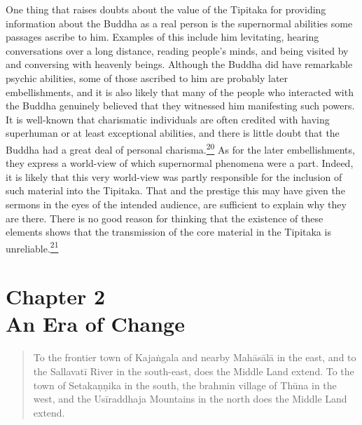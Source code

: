 One thing that raises doubts about the value of the Tipitaka for
providing information about the Buddha as a real person is the
supernormal abilities some passages ascribe to him. Examples of this
include him levitating, hearing conversations over a long distance,
reading people's minds, and being visited by and conversing with
heavenly beings. Although the Buddha did have remarkable psychic
abilities, some of those ascribed to him are probably later
embellishments, and it is also likely that many of the people who
interacted with the Buddha genuinely believed that they witnessed him
manifesting such powers. It is well-known that charismatic individuals
are often credited with having superhuman or at least exceptional
abilities, and there is little doubt that the Buddha had a great deal of
personal
charisma.\label{footprints_split_005.html_fnref20}\hyperref[footprints_split_024.htmlux5cux23fn20]{\textsuperscript{20}}
As for the later embellishments, they express a world-view of which
supernormal phenomena were a part. Indeed, it is likely that this very
world-view was partly responsible for the inclusion of such material
into the Tipitaka. That and the prestige this may have given the sermons
in the eyes of the intended audience, are sufficient to explain why they
are there. There is no good reason for thinking that the existence of
these elements shows that the transmission of the core material in the
Tipitaka is
unreliable.\label{footprints_split_005.html_fnref21}\hyperref[footprints_split_024.htmlux5cux23fn21]{\textsuperscript{21}}

\label{footprints_split_005.html_calibre_pb_11}

\label{footprints_split_006.html}{}

\section{\texorpdfstring{{Chapter 2}\\
An Era of
Change}{Chapter 2 An Era of Change}}\label{footprints_split_006.html_TOCTarget2}

\begin{quote}
To the frontier town of Kajaṅgala and nearby Mahāsālā in the east, and
to the Sallavatī River in the south-east, does the Middle Land extend.
To the town of Setakaṇṇika in the south, the brahmin village of Thūna in
the west, and the Usīraddhaja Mountains in the north does the Middle
Land extend.
\end{quote}

